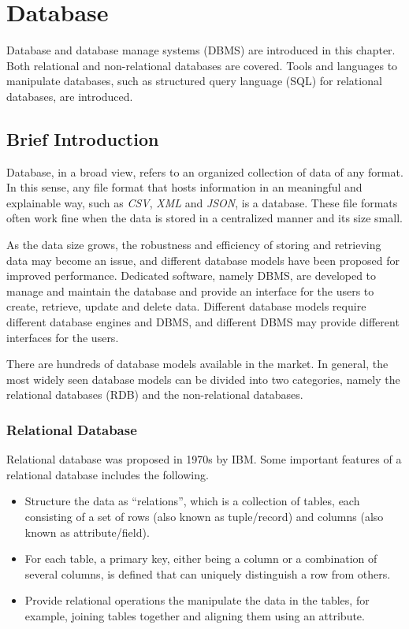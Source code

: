 \chapter{Database}

Database and database manage systems (DBMS) are introduced in this chapter. Both relational and non-relational databases are covered. Tools and languages to manipulate databases, such as structured query language (SQL) for relational databases, are introduced.

\section{Brief Introduction}

Database, in a broad view, refers to an organized collection of data of any format. In this sense, any file format that hosts information in an meaningful and explainable way, such as \textit{CSV}, \textit{XML} and \textit{JSON}, is a database. These file formats often work fine when the data is stored in a centralized manner and its size small.

As the data size grows, the robustness and efficiency of storing and retrieving data may become an issue, and different database models have been proposed for improved performance. Dedicated software, namely DBMS, are developed to manage and maintain the database and provide an interface for the users to create, retrieve, update and delete data. Different database models require different database engines and DBMS, and different DBMS may provide different interfaces for the users.

There are hundreds of database models available in the market. In general, the most widely seen database models can be divided into two categories, namely the relational databases (RDB) and the non-relational databases.

\subsection{Relational Database}

Relational database was proposed in 1970s by IBM. Some important features of a relational database includes the following.
\begin{itemize}
	\item Structure the data as ``relations'', which is a collection of tables, each consisting of a set of rows (also known as tuple/record) and columns (also known as attribute/field).
	\item For each table, a primary key, either being a column or a combination of several columns, is defined that can uniquely distinguish a row from others.
	\item Provide relational operations the manipulate the data in the tables, for example, joining tables together and aligning them using an attribute.
\end{itemize}

